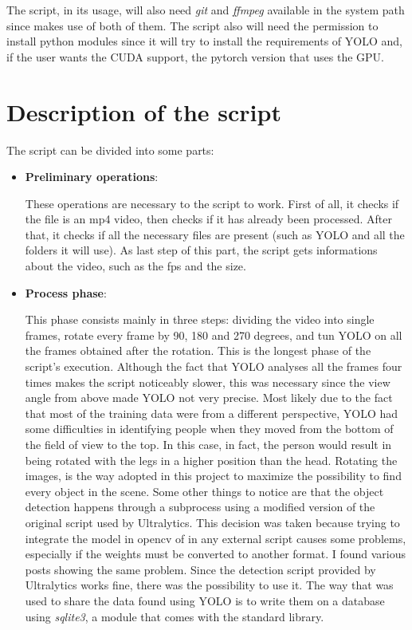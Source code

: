 \documentclass[conference]{IEEEtran}
\begin{document}
		The script, in its usage, will also need \textit{git} and \textit{ffmpeg} available in the system path since makes use of both of them.
		The script also will need the permission to install python modules since it will try to install the requirements of YOLO and, if the 
		user wants the CUDA support, the pytorch version that uses the GPU. 


	\section{Description of the script}
	
		The script can be divided into some parts:
		
		\begin{itemize}
			
			\item \textbf{Preliminary operations}:
				
				These operations are necessary to the script to work. First of all, it checks if the file is an mp4 video, then checks if it has already
				been processed. After that, it checks if all the necessary files are present (such as YOLO and all the folders it will use). 
				As last step of this part, the script gets informations about the video, such as the fps and the size.
			
			\item \textbf{Process phase\label{sec:dpp}}:
			
				This phase consists mainly in three steps: dividing the video into single frames, rotate every frame by 90, 180 and 270 degrees, and 
				tun YOLO on all the frames obtained after the rotation. This is the longest phase of the script's execution. Although the fact that 
				YOLO analyses all the frames four times makes the script noticeably slower, this was necessary since the view angle from above made 
				YOLO not very precise. Most likely due to the fact that most of the training data were from a different perspective, YOLO had some 
				difficulties in identifying people when they moved from the bottom of the field of view to the top. In this case, in fact, the person 
				would result in being rotated with the legs in a higher position than the head. Rotating the images, is the way adopted in this project 
				to maximize the possibility to find every object in the scene. Some other things to notice are that the object detection happens through 
				a subprocess  using a modified version of the original script used by Ultralytics. This decision was taken because trying to integrate 
				the model in opencv of in any external script causes some problems, especially if the weights must be converted to another format. I found 
				various posts showing the same problem. Since the detection script provided by Ultralytics works fine, there was the possibility to use it.
				The way that was used to share the data found using YOLO is to write them on a database using \textit{sqlite3}, a module that comes with 
				the standard library.
			

\end{itemize}
\end{document}

